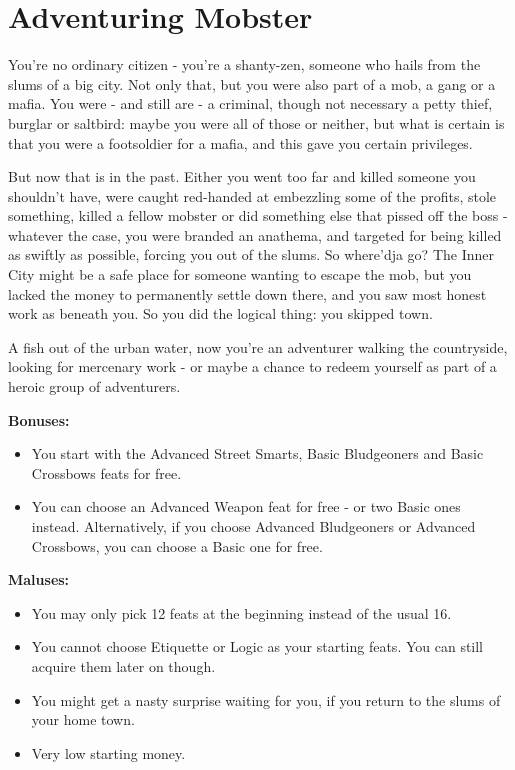 \section{Adventuring Mobster}
You're no ordinary citizen - you're a shanty-zen, someone who hails from the slums of a big city. Not only that, but you were also part of a mob, a gang or a mafia. You were - and still are - a criminal, though not necessary a petty thief, burglar or saltbird: maybe you were all of those or neither, but what is certain is that you were a footsoldier for a mafia, and this gave you certain privileges. 

But now that is in the past. Either you went too far and killed someone you shouldn't have, were caught red-handed at embezzling some of the profits, stole something, killed a fellow mobster or did something else that pissed off the boss - whatever the case, you were branded an anathema, and targeted for being killed as swiftly as possible, forcing you out of the slums. So where'dja go? The Inner City might be a safe place for someone wanting to escape the mob, but you lacked the money to permanently settle down there, and you saw most honest work as beneath you. So you did the logical thing: you skipped town.

A fish out of the urban water, now you're an adventurer walking the countryside, looking for mercenary work - or maybe a chance to redeem yourself as part of a heroic group of adventurers.

\textbf{Bonuses:}
\begin{itemize}
	\item You start with the Advanced Street Smarts, Basic Bludgeoners and Basic Crossbows feats for free.
	\item You can choose an Advanced Weapon feat for free - or two Basic ones instead. Alternatively, if you choose Advanced Bludgeoners or Advanced Crossbows, you can choose a Basic one for free.
\end{itemize}


\textbf{Maluses:}
\begin{itemize}
	\item You may only pick 12 feats at the beginning instead of the usual 16.
	\item You cannot choose Etiquette or Logic as your starting feats. You can still acquire them later on though.
	\item You might get a nasty surprise waiting for you, if you return to the slums of your home town. 
	\item Very low starting money.
\end{itemize}
